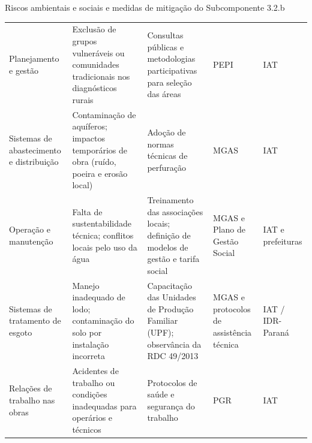 \begin{quadro}[htbp]
\caption{Riscos ambientais e sociais e medidas de mitigação do Subcomponente 3.2.b}
\label{qua:salvaguardas}
\footnotesize
\renewcommand{\arraystretch}{1.25}
\begin{tabularx}{\textwidth}{|P{2.4cm}|L|L|P{2.5cm}|P{1.9cm}|}
\hline
{} &  &  &
 &  \\ \hline
Planejamento e gestão &
Exclusão de grupos vulneráveis ou comunidades tradicionais nos diagnósticos rurais &
Consultas públicas e metodologias participativas para seleção das áreas &
PEPI & IAT \\ \hline
Sistemas de abastecimento e distribuição &
Contaminação de aquíferos; impactos temporários de obra (ruído, poeira e erosão local) &
Adoção de normas técnicas de perfuração &
MGAS & IAT \\ \hline
Operação e manutenção &
Falta de sustentabilidade técnica; conflitos locais pelo uso da água &
Treinamento das associações locais; definição de modelos de gestão e tarifa social &
MGAS e Plano de Gestão Social & IAT e prefeituras \\ \hline
Sistemas de tratamento de esgoto &
Manejo inadequado de lodo; contaminação do solo por instalação incorreta &
Capacitação das Unidades de Produção Familiar (UPF); observância da RDC 49/2013 &
MGAS e protocolos de assistência técnica & IAT / IDR-Paraná \\ \hline
Relações de trabalho nas obras &
Acidentes de trabalho ou condições inadequadas para operários e técnicos &
Protocolos de saúde e segurança do trabalho &
PGR & IAT \\ \hline
\end{tabularx}
\end{quadro}

